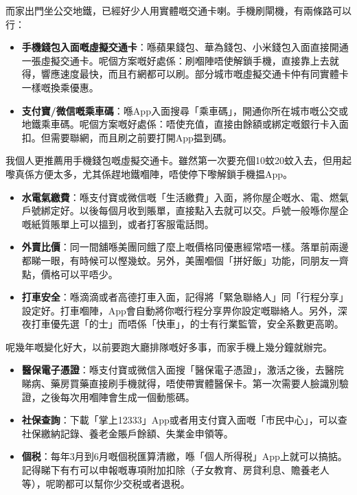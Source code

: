 
而家出門坐公交地鐵，已經好少人用實體嘅交通卡喇。手機刷閘機，有兩條路可以行：

\begin{itemize}
  \item \textbf{手機錢包入面嘅虛擬交通卡}：喺蘋果錢包、華為錢包、小米錢包入面直接開通一張虛擬交通卡。呢個方案嘅好處係：刷嗰陣唔使解鎖手機，直接靠上去就得，響應速度最快，而且冇網都可以刷。部分城市嘅虛擬交通卡仲有同實體卡一樣嘅換乘優惠。
  \item \textbf{支付寶/微信嘅乘車碼}：喺App入面搜尋「乘車碼」，開通你所在城市嘅公交或地鐵乘車碼。呢個方案嘅好處係：唔使充值，直接由餘額或綁定嘅銀行卡入面扣。但需要聯網，而且刷之前要打開App揾到碼。
\end{itemize}

我個人更推薦用手機錢包嘅虛擬交通卡。雖然第一次要充個10蚊20蚊入去，但用起嚟真係方便太多，尤其係趕地鐵嗰陣，唔使停下嚟解鎖手機揾App。


\begin{itemize}
  \item \textbf{水電氣繳費}：喺支付寶或微信嘅「生活繳費」入面，將你屋企嘅水、電、燃氣戶號綁定好。以後每個月收到賬單，直接點入去就可以交。戶號一般喺你屋企嘅紙質賬單上可以搵到，或者打客服電話問。
  \item \textbf{外賣比價}：同一間舖喺美團同餓了麼上嘅價格同優惠經常唔一樣。落單前兩邊都睇一眼，有時候可以慳幾蚊。另外，美團嗰個「拼好飯」功能，同朋友一齊點，價格可以平唔少。
  \item \textbf{打車安全}：喺滴滴或者高德打車入面，記得將「緊急聯絡人」同「行程分享」設定好。打車嗰陣，App會自動將你嘅行程分享畀你設定嘅聯絡人。另外，深夜打車優先選「的士」而唔係「快車」，的士有行業監管，安全系數更高啲。
\end{itemize}


呢幾年嘅變化好大，以前要跑大廳排隊嘅好多事，而家手機上幾分鐘就辦完。

\begin{itemize}
  \item \textbf{醫保電子憑證}：喺支付寶或微信入面搜「醫保電子憑證」，激活之後，去醫院睇病、藥房買藥直接刷手機就得，唔使帶實體醫保卡。第一次需要人臉識別驗證，之後每次用嗰陣會生成一個動態碼。
  \item \textbf{社保查詢}：下載「掌上12333」App或者用支付寶入面嘅「市民中心」，可以查社保繳納記錄、養老金賬戶餘額、失業金申領等。
  \item \textbf{個税}：每年3月到6月嘅個税匯算清繳，喺「個人所得税」App上就可以搞掂。記得睇下有冇可以申報嘅專項附加扣除（子女教育、房貸利息、贍養老人等），呢啲都可以幫你少交税或者退税。
\end{itemize}

